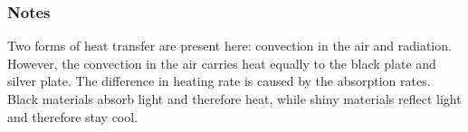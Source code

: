 \subsubsection*{Notes}
Two forms of heat transfer are present here: convection in the air and radiation.  However, the convection in the air carries heat equally to the black plate and silver plate.  The difference in heating rate is caused by the absorption rates.  Black materials absorb light and therefore heat, while shiny materials reflect light and therefore stay cool.
